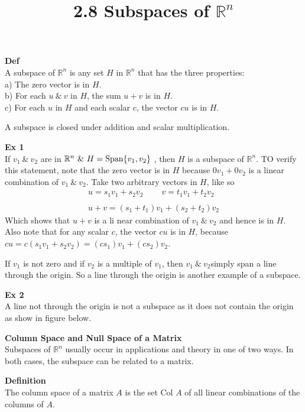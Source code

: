 \documentclass{article}
\title{2.8 Subspaces of $ \mathbb{R}^{n}  $ }
\begin{document}
  \maketitle
  \textbf{Def}\\
  A subspace of $ \mathbb{R}^{n}  $ is any set $ H $ in $ \mathbb{R}^{n}$ that has the three properties:\\
  a) The zero vector is in $ H $.\\
  b) For each $ u ~\&~ v$ in $ H $, the sum $ u+v $ is in $ H $.\\
  c) For each $ u $ in $ H $ and each scalar $ c $, the vector $ cu $ is in $ H $.

  A subspace is closed under addition and scalar multiplication.

  \textbf{Ex 1}\\
  If $ v_1 ~\&~ v_2$ are in $ \mathbb{R}^{n} ~\&~ H= \text{Span$ \{ v_1,v_2\} $ } $, then $ H $ is a subspace of $ \mathbb{R}^{n}  $. TO verify this statement, note that the zero vector is in $ H $ because $ 0v_1 +0v_2$ is a linear combination of $ v_1 ~\&~ v_2 $. Take two arbitrary vectors in $ H $, like so
  \[
    \begin{gathered}
    u=s_1v_1+s_2v_2 ~ \qquad v=t_1v_1+t_2v_2\\
    ~\\
    u+v=(s_1+t_1)v_1+(s_2+t_2)v_2
    \end{gathered}
  \]
  Which shows that $ u+v $ is a li near combination of $ v_1 ~\&~ v_2 $ and hence is in $ H $. Also note that for any scalar $ c $, the vector $ cu $ is in $ H $, because $ cu=c(s_1v_1+s_2v_2)=(cs_1)v_1 +(cs_2)v_2$.

  If $ v_1 $ is not zero and if $ v_2 $ is a multiple of $ v_1 $, then $ v_1 ~\&~ v_2$simply span a line through the origin. So a line through the origin is another example of a subspace.

  \textbf{Ex 2}\\
  A line not through the origin is not a subspace as it does not contain the origin as show in figure below.

  \textbf{Column Space and Null Space of a Matrix}\\
  Subspaces of $ \mathbb{R}^{n}  $ usually occur in applications and theory in one of two ways. In both cases, the subspace can be related to a matrix.

  \textbf{Definition}\\
  The column space of a matrix $ A $ is the set Col $ A $ of all linear combinations of the columns of $ A $.
\end{document}
